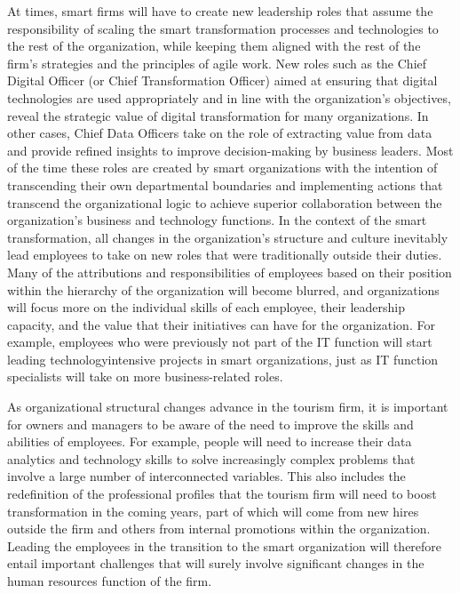 \documentclass[
  letterpaper,
  DIV=11,
  numbers=noendperiod]{scrreprt}
\begin{document}
At times, smart firms will have to create new leadership roles that
assume the responsibility of scaling the smart transformation processes
and technologies to the rest of the organization, while keeping them
aligned with the rest of the firm's strategies and the principles of
agile work. New roles such as the Chief Digital Officer (or Chief
Transformation Officer) aimed at ensuring that digital technologies are
used appropriately and in line with the organization's objectives,
reveal the strategic value of digital transformation for many
organizations. In other cases, Chief Data Officers take on the role of
extracting value from data and provide refined insights to improve
decision-making by business leaders. Most of the time these roles are
created by smart organizations with the intention of transcending their
own departmental boundaries and implementing actions that transcend the
organizational logic to achieve superior collaboration between the
organization's business and technology functions. In the context of the
smart transformation, all changes in the organization's structure and
culture inevitably lead employees to take on new roles that were
traditionally outside their duties. Many of the attributions and
responsibilities of employees based on their position within the
hierarchy of the organization will become blurred, and organizations
will focus more on the individual skills of each employee, their
leadership capacity, and the value that their initiatives can have for
the organization. For example, employees who were previously not part of
the IT function will start leading technologyintensive projects in smart
organizations, just as IT function specialists will take on more
business-related roles.

As organizational structural changes advance in the tourism firm, it is
important for owners and managers to be aware of the need to improve the
skills and abilities of employees. For example, people will need to
increase their data analytics and technology skills to solve
increasingly complex problems that involve a large number of
interconnected variables. This also includes the redefinition of the
professional profiles that the tourism firm will need to boost
transformation in the coming years, part of which will come from new
hires outside the firm and others from internal promotions within the
organization. Leading the employees in the transition to the smart
organization will therefore entail important challenges that will surely
involve significant changes in the human resources function of the firm.
\end{document}
